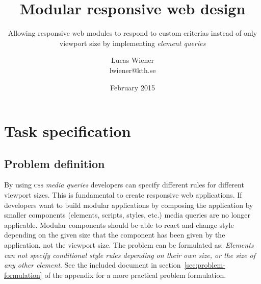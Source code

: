 \documentclass[oneside,a4paper,11pt]{kth-mag}
\title{Modular responsive web design}
\subtitle{Allowing responsive web modules to respond to custom criterias instead of only viewport size by implementing \emph{element queries}}
\author{Lucas Wiener \\ \lowercase{lwiener@kth.se}}
\date{February 2015}
\begin{document}
\frontmatter
\pagestyle{empty}
\removepagenumbers
\maketitle
\clearpage
\tableofcontents*
\mainmatter
\chapter{Task specification}
\section{Problem definition}
By using \textsc{css} \emph{media queries} developers can specify different rules for different viewport sizes.
This is fundamental to create responsive web applications.
If developers want to build modular applications by composing the application by smaller components (elements, scripts, styles, etc.) media queries are no longer applicable.
Modular components should be able to react and change style depending on the given size that the component has been given by the application, not the viewport size.
The problem can be formulated as: \emph{Elements can not specify conditional style rules depending on their own size, or the size of any other element}.
See the included document in section~\ref{sec:problem-formulation} of the appendix for a more practical problem formulation.
\end{document}
